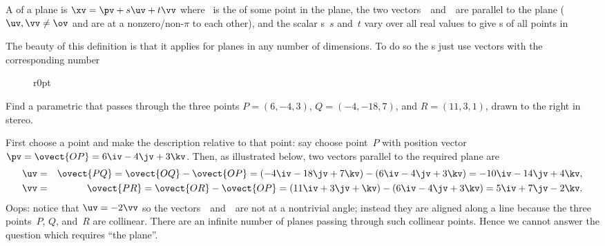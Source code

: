 \begin{definition} \label{def:parpla}
A  of a plane is \(\xv=\pv+s\uv+t\vv\) where \pv~is the  of some point in the plane,   the two vectors~\uv\ and~\vv\ are parallel to the plane (\(\uv,\vv\neq\ov\) and are at a nonzero\slash non-\(\pi\)  to each other), and the scalar s~\(s\) and~\(t\) vary over all real values to give s of all points in 
\end{definition}

The beauty of this definition is that it applies for planes in any number of dimensions.
To do so the s just use vectors with the corresponding number 

\begin{figure}[8]r{0pt}
 {}
\end{figure}
\begin{example} 
Find a parametric  that passes through the three points \(P=(6,-4,3)\), \(Q=(-4,-18,7)\), and \(R=(11,3,1)\), drawn to the right in stereo.

\begin{solution} 
First choose a point and make the description relative to that point: say choose point~\(P\) with position vector \(\pv=\ovect{OP}=6\iv-4\jv+3\kv\).
Then, as illustrated below, two vectors parallel to the required plane are 
\begin{eqnarray*}
\uv&=&\ovect{PQ} =\ovect{OQ}-\ovect{OP} 
=(-4\iv-18\jv+7\kv)-(6\iv-4\jv+3\kv) 
=-10\iv-14\jv+4\kv,
\\\vv&=&\ovect{PR} =\ovect{OR}-\ovect{OP} 
=(11\iv+3\jv+\kv)-(6\iv-4\jv+3\kv) 
=5\iv+7\jv-2\kv.
\end{eqnarray*}
Oops: notice that \(\uv=-2\vv\) so the vectors~\uv\ and~\vv\ are not at a nontrivial angle; instead they are aligned along a line because the three points~\(P\), \(Q\), and~\(R\) are collinear.
There are an infinite number of planes passing through such collinear  points.
Hence we cannot answer the question which requires ``the plane''.
\end{solution}
\end{example}



